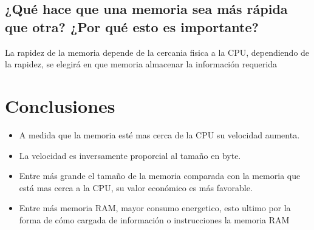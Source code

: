 \documentclass[12pt,letterpaper]{article}
\begin{document}
\subsection{¿Qué hace que una memoria sea más rápida que otra? ¿Por qué esto es importante?}
    La rapidez de la memoria depende de la cercania fisica a la CPU, dependiendo de la rapidez, se elegirá en que memoria almacenar la información requerida 
        
\newpage

\section{Conclusiones}
    \begin{itemize}
        \item A medida que la memoria esté mas cerca de la CPU su velocidad aumenta.
        \item La velocidad es inversamente proporcial al tamaño en byte.
        \item Entre más grande el tamaño de la memoria comparada con la memoria que está mas cerca a la CPU, su valor económico es más favorable.
        \item Entre más memoria RAM, mayor consumo energetico, esto ultimo por la forma de cómo cargada de información o instrucciones la memoria RAM
    \end{itemize}

\newpage



\end{document}

